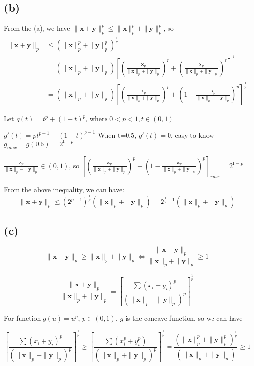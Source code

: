 \documentclass{article}
\begin{document}
\subsection*{(b)}   

From the (a), we have $\| \mathbf{x}+\mathbf{y}\|_p^p \leq \| \mathbf{x}\|_p^p +\| \mathbf{y}\|_p^p$, so
\begin{align*}
	\| \mathbf{x}+\mathbf{y}\|_p 
	&\leq (\| \mathbf{x}\|_p^p +\| \mathbf{y}\|_p^p)^\frac{1}{p} \\
	&= (\| \mathbf{x}\|_p +\| \mathbf{y}\|_p)[(\frac{\mathbf{x}_p}{\| \mathbf{x}\|_p +\| \mathbf{y}\|_p})^p+(\frac{\mathbf{y}_p}{\| \mathbf{x}\|_p +\| \mathbf{y}\|_p})^p]^\frac{1}{p} \\
	&= (\| \mathbf{x}\|_p +\| \mathbf{y}\|_p)[(\frac{\mathbf{x}_p}{\| \mathbf{x}\|_p +\| \mathbf{y}\|_p})^p+(1-\frac{\mathbf{x}_p}{\| \mathbf{x}\|_p +\| \mathbf{y}\|_p})^p]^\frac{1}{p}
\end{align*}

Let $g(t)=t^p+(1-t)^p$, where $0<p<1, t\in(0,1)$

$g'(t)=pt^{p-1}+(1-t)^{p-1} $ When t=0.5, $g'(t)=0$, easy to know $g_{max}=g(0.5)=2^{1-p}$

$\frac{\mathbf{x}_p}{\| \mathbf{x}\|_p +\| \mathbf{y}\|_p} \in (0,1)$, so $[(\frac{\mathbf{x}_p}{\| \mathbf{x}\|_p +\| \mathbf{y}\|_p})^p+(1-\frac{\mathbf{x}_p}{\| \mathbf{x}\|_p +\| \mathbf{y}\|_p})^p]_{max}=2^{1-p}$

From the above inequality, we can have:
$$
\| \mathbf{x}+\mathbf{y}\|_p \leq (2^{p-1})^\frac{1}{p}(\| \mathbf{x}\|_p +\| \mathbf{y}\|_p) =2^{\frac{1}{p}-1}(\| \mathbf{x}\|_p +\| \mathbf{y}\|_p)
$$

\subsection*{(c)} 

$$
\| \mathbf{x}+\mathbf{y}\|_p \geq \| \mathbf{x}\|_p +\| \mathbf{y}\|_p \Leftrightarrow \frac{\| \mathbf{x}+\mathbf{y}\|_p}{\|\mathbf{x}\|_p +\| \mathbf{y}\|_p} \geq 1
$$

$$
\frac{\| \mathbf{x}+\mathbf{y}\|_p}{\|\mathbf{x}\|_p +\| \mathbf{y}\|_p}=[\frac{\sum (x_i+y_i)^p}{(\| \mathbf{x}\|_p +\| \mathbf{y}\|_p)^p}]^{\frac{1}{p}}
$$

For function $g(u)=u^p$, $p\in (0,1)$, $g$ is the concave function, so we can have

$$
[\frac{\sum (x_i+y_i)^p}{(\| \mathbf{x}\|_p +\| \mathbf{y}\|_p)^p}]^{\frac{1}{p}} \geq [\frac{\sum (x_i^p+y_i^p)}{(\| \mathbf{x}\|_p +\| \mathbf{y}\|_p)^p}]^{\frac{1}{p}} = \frac{(\| \mathbf{x}\|_p^p +\| \mathbf{y}\|_p^p)^{\frac{1}{p}}}{(\| \mathbf{x}\|_p +\| \mathbf{y}\|_p)} \geq 1
$$
\end{document}
